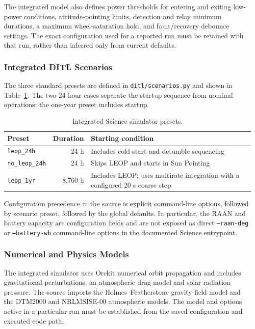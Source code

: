 The integrated model also defines power thresholds for entering and exiting low-power conditions, attitude-pointing limits, detection and relay minimum durations, a maximum wheel-saturation hold, and fault/recovery debounce settings. The exact configuration used for a reported run must be retained with that run, rather than inferred only from current defaults.

\subsubsection{Integrated DITL Scenarios}
\label{app:ditl-scenarios}
The three standard presets are defined in \texttt{ditl/scenarios.py} and shown in Table~\ref{tab:science-scenario-presets}. The two 24-hour cases separate the startup sequence from nominal operations; the one-year preset includes startup.

\begin{table}[htbp]
\centering
\caption{Integrated Science simulator presets.}
\label{tab:science-scenario-presets}
\begin{tabularx}{\linewidth}{l r X}
\toprule
Preset & Duration & Starting condition \\
\midrule
\texttt{leop\_24h} & 24 h & Includes cold-start and detumble sequencing \\
\texttt{no\_leop\_24h} & 24 h & Skips LEOP and starts in Sun Pointing \\
\texttt{leop\_1yr} & 8,760 h & Includes LEOP; uses multirate integration with a configured 20 s coarse step \\
\bottomrule
\end{tabularx}
\end{table}

Configuration precedence in the source is explicit command-line options, followed by scenario preset, followed by the global defaults. In particular, the RAAN and battery capacity are configuration fields and are not exposed as direct \texttt{--raan-deg} or \texttt{--battery-wh} command-line options in the documented Science entrypoint.

\subsubsection{Numerical and Physics Models}
\label{app:physics-assumptions}
The integrated simulator uses Orekit numerical orbit propagation and includes gravitational perturbations, an atmospheric drag model and solar radiation pressure. The source imports the Holmes--Featherstone gravity-field model and the DTM2000 and NRLMSISE-00 atmospheric models. The model and options active in a particular run must be established from the saved configuration and executed code path.

